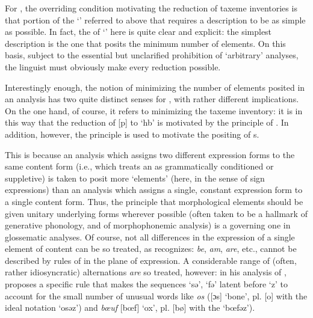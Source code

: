 For {\Hjelmslev}, the overriding condition motivating the reduction of
taxeme inventories is that portion of the `'
referred to above that requires a description to be as simple as
possible. In fact, the  of `' here is quite clear and
explicit: the simplest description is the one that posits the minimum
number of elements. On this basis, subject to the essential but
unclarified prohibition of `arbitrary' analyses, the linguist must
obviously make every reduction possible.

Interestingly enough, the notion of minimizing the number of elements
posit\-ed in an analysis has two quite distinct senses for {\Hjelmslev},
with rather different implications. On the one hand, of course, it
refers to minimizing the taxeme inventory: it is in this way that the
reduction of  {[p]} to `hb' is motivated by the principle of
. In addition, however, the principle is used to motivate
the positing of s.

This is because an analysis which assigns two different expression
forms to the same content form (i.e., which treats an  as
grammatically conditioned or suppletive) is taken to posit more
`elements' (here, in the sense of sign expressions) than an analysis
which assigns a single, constant expression form to a single content
form. Thus, the principle that morphological elements should be given
unitary underlying forms wherever possible (often taken to be a
hallmark of generative phonology, and of morphophonemic analysis) is a
governing one in glossematic analyses. Of course, not all differences
in the expression of a single element of content can be so treated, as
{\Hjelmslev} recognizes:  \emph{be}, \emph{am}, \emph{are}, etc.,
cannot be described by {rules} of  in the plane of
expression. A considerable range of (often, rather idiosyncratic)
alternations \emph{are} so treated, however: in his analysis of
, {\Hjelmslev} proposes a specific rule that makes the sequences
`sə', `fə' latent before `z' to account for the small number of
unusual words like \emph{os} ({[ɔs]} `bone', pl. {[o]} with the ideal
notation `osəz') and \emph{bœuf} {[bœf]} `ox', pl. {[bø]} with the
 `bœfəz').

